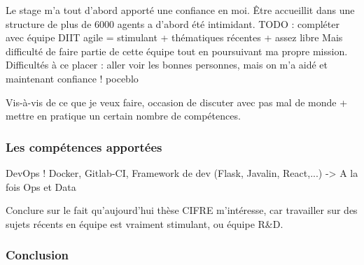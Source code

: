 Le stage m'a tout d'abord apporté une confiance en moi. Être accueillit dans une structure de plus de 6000 agents a d'abord été intimidant. 
TODO : compléter avec équipe DIIT agile = stimulant + thématiques récentes + assez libre
Mais difficulté de faire partie de cette équipe tout en poursuivant ma propre mission. Difficultés à ce placer : aller voir les bonnes personnes, mais on m'a aidé et maintenant confiance ! poceblo
\newline

Vis-à-vis de ce que je veux faire, occasion de discuter avec pas mal de monde + mettre en pratique un certain nombre de compétences.

\subsubsection{Les compétences apportées}
DevOps ! Docker, Gitlab-CI, Framework de dev (Flask, Javalin, React,...) -> A la fois Ops et Data

Conclure sur le fait qu'aujourd'hui thèse CIFRE m'intéresse, car travailler sur des sujets récents en équipe est vraiment stimulant, ou équipe R\&D.

\subsubsection*{Conclusion}
